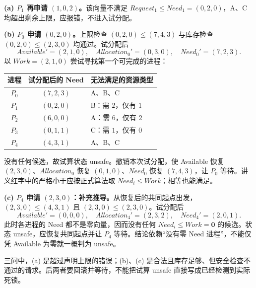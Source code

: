 \begin{checkedsolution}
\textbf{(a) $P_1$ 再申请 $(1,0,2)$。}该向量不满足 $Request_1\le Need_1=(0,2,0)$，A、C 均超出剩余上限，应报错，不进入试分配。

\textbf{(b) $P_0$ 申请 $(0,2,0)$。}上限检查 $(0,2,0)\le(7,4,3)$ 与库存检查 $(0,2,0)\le(2,3,0)$ 均通过。试分配后
\[
  Available'=(2,1,0),\quad Allocation_0'=(0,3,0),\quad Need_0'=(7,2,3).
\]
以 $Work=(2,1,0)$ 尝试寻找第一个可完成的进程：
\begin{center}
\begin{tabular}{@{}ccl@{}}
  \toprule
  进程 & 试分配后的 Need & 无法满足的资源类型 \\
  \midrule
  $P_0$ & $(7,2,3)$ & A、B、C \\
  $P_1$ & $(0,2,0)$ & B：需 $2$，仅有 $1$ \\
  $P_2$ & $(6,0,0)$ & A：需 $6$，仅有 $2$ \\
  $P_3$ & $(0,1,1)$ & C：需 $1$，仅有 $0$ \\
  $P_4$ & $(4,3,1)$ & A、B、C \\
  \bottomrule
\end{tabular}
\end{center}
没有任何候选，故试算状态 unsafe。撤销本次试分配，使 Available 恢复 $(2,3,0)$、$Allocation_0$ 恢复 $(0,1,0)$、$Need_0$ 恢复 $(7,4,3)$，让 $P_0$ 等待。讲义红字中的严格小于应按正式算法取 $Need_i\le Work$；相等也能满足。

\textbf{(c) $P_4$ 申请 $(2,3,0)$：补充推导。}从恢复后的共同起点出发，$(2,3,0)\le(4,3,1)$ 且 $(2,3,0)\le(2,3,0)$。试分配后
\[
  Available'=(0,0,0),\quad Allocation_4'=(2,3,2),\quad Need_4'=(2,0,1).
\]
此时各进程的 Need 都不是零向量，因而没有任何 $Need_i\le Work=\mathbf0$ 的候选。状态 unsafe，应恢复共同起点并让 $P_4$ 等待。结论依赖“没有零 Need 进程”，不能仅凭 Available 为零就一概判为 unsafe。

三问中，(a) 是超过声明上限的错误；(b)、(c) 是合法且库存足够、但安全检查不通过的请求。后两者要回滚并等待，不能把试算 unsafe 直接写成已经检测到实际死锁。
\end{checkedsolution}
